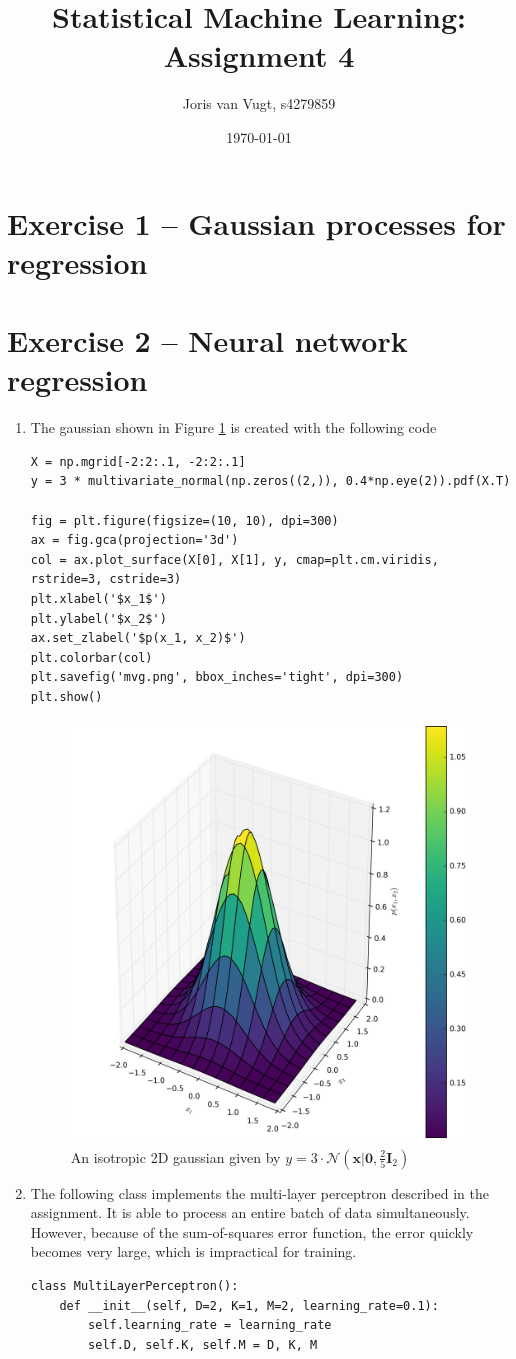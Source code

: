 \documentclass[a4paper]{article}
\author{Joris van Vugt, s4279859}
\title{Statistical Machine Learning: Assignment 4} %
\date{\today}
\begin{document}
\maketitle
\section*{Exercise 1 -- Gaussian processes for regression}

\pagebreak
\section*{Exercise 2 -- Neural network regression} %
\begin{enumerate}
\item The gaussian shown in Figure \ref{fig:mvg} is created with the following code
\begin{lstlisting}
X = np.mgrid[-2:2:.1, -2:2:.1]
y = 3 * multivariate_normal(np.zeros((2,)), 0.4*np.eye(2)).pdf(X.T)

fig = plt.figure(figsize=(10, 10), dpi=300)
ax = fig.gca(projection='3d')
col = ax.plot_surface(X[0], X[1], y, cmap=plt.cm.viridis, rstride=3, cstride=3)
plt.xlabel('$x_1$')
plt.ylabel('$x_2$')
ax.set_zlabel('$p(x_1, x_2)$')
plt.colorbar(col)
plt.savefig('mvg.png', bbox_inches='tight', dpi=300)
plt.show()
\end{lstlisting}
\begin{figure}
\centering
\includegraphics[width=.8\linewidth]{figures/mvg.png}
\caption{An isotropic 2D gaussian given by $y = 3 \cdot \mathcal{N}(\bm{x}|\bm{0}, \frac{2}{5}\bm{I}_2)$}
\label{fig:mvg}
\end{figure}
\item The following class implements the multi-layer perceptron described in the assignment. It is able to process an entire batch of data simultaneously. However, because of the sum-of-squares error function, the error quickly becomes very large, which is impractical for training.
\begin{lstlisting}
class MultiLayerPerceptron():
    def __init__(self, D=2, K=1, M=2, learning_rate=0.1):
        self.learning_rate = learning_rate
        self.D, self.K, self.M = D, K, M
        

\end{lstlisting}
\end{enumerate}
\end{document}
